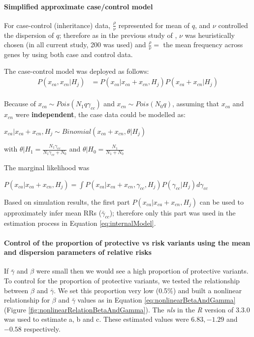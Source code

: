 \documentclass[]{article}
\begin{document}
\paragraph{Simplified approximate case/control model}

For case-control (inheritance) data, $\frac{\rho}{\nu}$ represented for mean of $q$, and $\nu$ controlled the
  dispersion of $q$; therefore as in the previous study
  of \cite{de2014synaptic}, $\nu$ was heuristically chosen (in all
  current study, 200 was used) and $\frac{\rho}{\nu} = $ the mean frequency across genes by
  using both case and control data.

The case-control model was deployed as follows:
\begin{equation}
\begin{array}{ll}
P(x_{ca}, x_{cn}|H_j) & = P(x_{ca}|x_{ca} + x_{cn}, H_j) P(x_{ca} + x_{cn}| H_j) \\
\end{array}
\end{equation}

Because of $x_{ca} \sim Pois(N_1 q \gamma_{cc})$ and $x_{cn} \sim
Pois(N_0 q)$, assuming that $x_{ca}$ and $x_{cn}$ were
\textbf{independent}, the case data could be modelled as:

$x_{ca}|x_{ca} + x_{cn}, H_j \sim Binomial(x_{ca} + x_{cn}, \theta|H_j)$

with $\theta|H_1 = \frac{N_1 \gamma_{cc}}{N_1 \gamma_{cc} + N_0}$ and $\theta |H_0 = \frac{N_1}{N_1 + N_0}$

The marginal likelihood was

$P(x_{ca}|x_{ca} + x_{cn}, H_j) = \int P(x_{ca}|x_{ca} + x_{cn}, \gamma_{cc}, H_j) P(\gamma_{cc} | H_j) d \gamma_{cc} $

Based on simulation results, the first part $P(x_{ca}|x_{ca} + x_{cn}, H_j)$ can be used to approximately infer mean RRs ($\bar{\gamma}_{cc}$); therefore only this part was used in the estimation process in Equation \ref{eq:internalModel}.





\paragraph{Control of the proportion of protective vs risk variants using the mean and
dispersion parameters of relative risks}

If $\bar{\gamma}$ and $\beta$ were small then we would see a high proportion of protective variants.
To control for the proportion of protective variants, we tested the
relationship between $\beta$ and $\bar{\gamma}$. We set this proportion very
low (0.5$\%$) and built a nonlinear relationship for $\beta$ and $\bar{\gamma}$
values as in Equation \ref{eq:nonlinearBetaAndGamma} (Figure
\ref{fig:nonlinearRelationBetaAndGamma}). The \textit{nls} in the
\textit{R} version of 3.3.0 \citep{rteam2016} was used to estimate
a, b and c. These estimated values were $6.83, -1.29$ and $
-0.58$ respectively.
\end{document}
